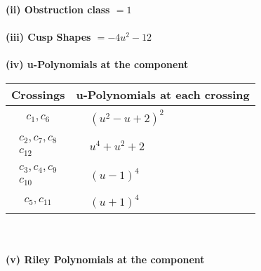 \documentclass[1p]{elsarticle_modified}
\theoremstyle{definition}
\begin{document}
\flushleft \textbf{(ii) Obstruction class $= 1$}\\~\\
\flushleft \textbf{(iii) Cusp Shapes $= -4 u^2-12$}\\~\\
\newpage\renewcommand{\arraystretch}{1}
\flushleft \textbf{(iv) u-Polynomials at the component}\newline \\
\begin{tabular}{m{50pt}|m{274pt}}
Crossings & \hspace{64pt}u-Polynomials at each crossing \\
\hline $$\begin{aligned}c_{1},c_{6}\end{aligned}$$&$\begin{aligned}
&(u^2- u+2)^2
\end{aligned}$\\
\hline $$\begin{aligned}c_{2},c_{7},c_{8}\\c_{12}\end{aligned}$$&$\begin{aligned}
&u^4+u^2+2
\end{aligned}$\\
\hline $$\begin{aligned}c_{3},c_{4},c_{9}\\c_{10}\end{aligned}$$&$\begin{aligned}
&(u-1)^4
\end{aligned}$\\
\hline $$\begin{aligned}c_{5},c_{11}\end{aligned}$$&$\begin{aligned}
&(u+1)^4
\end{aligned}$\\
\hline
\end{tabular}\\~\\
\newpage\renewcommand{\arraystretch}{1}
\flushleft \textbf{(v) Riley Polynomials at the component}\newline \\
\end{document}
